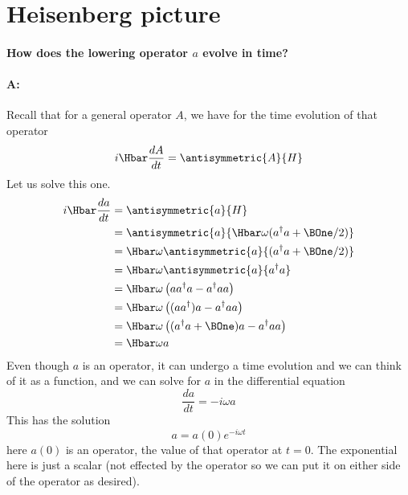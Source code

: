 \section{Heisenberg picture}
%
\paragraph{How does the lowering operator \(a\) evolve in time?}
%
\paragraph{A:} Recall that for a general operator \(A\), we have for the time evolution of that operator
%
\begin{equation}\label{eqn:PHY356FLecture11:270}
i \Hbar \frac{d A}{dt} = \antisymmetric{ A }{H}
\end{equation}
%
Let us solve this one.
%
\begin{equation}\label{eqn:lecture11harmonicOscillator:780}
\begin{aligned}
i \Hbar \frac{d a}{dt}
&= \antisymmetric{ a }{H} \\
&= \antisymmetric{ a }{ \Hbar \omega (a^\dagger a + \BOne/2) } \\
&= \Hbar\omega \antisymmetric{ a }{ (a^\dagger a + \BOne/2) } \\
&= \Hbar\omega \antisymmetric{ a }{ a^\dagger a } \\
&= \Hbar\omega \left( a a^\dagger a - a^\dagger a a \right) \\
&= \Hbar\omega \left( (a a^\dagger) a - a^\dagger a a \right) \\
&= \Hbar\omega \left( (a^\dagger a + \BOne) a - a^\dagger a a \right) \\
&= \Hbar\omega a
\end{aligned}
\end{equation}
%
Even though \(a\) is an operator, it can undergo a time evolution and we can think of it as a function, and we can solve for \(a\) in the differential equation
%
\begin{equation}\label{eqn:PHY356FLecture11:280}
\frac{d a}{dt} = -i \omega a
\end{equation}
%
This has the solution
\begin{equation}\label{eqn:PHY356FLecture11:290}
a = a(0) e^{-i \omega t}
\end{equation}
%
here \(a(0)\) is an operator, the value of that operator at \(t = 0\).  The exponential here is just a scalar (not effected by the operator so we can put it on either side of the operator as desired).
%
